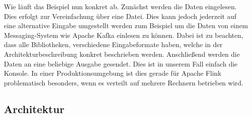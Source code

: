Wie läuft das Beispiel nun konkret ab. Zunächst werden die Daten eingelesen. Dies
erfolgt zur Vereinfachung über eine Datei. Dies kann jedoch jederzeit auf eine
alternative Eingabe umgestellt werden zum Beispiel um die Daten von einem
Messaging-System wie Apache Kafka einlesen zu können. Dabei ist zu beachten,
dass alle Bibliotheken, verschiedene Eingabeformate haben, welche in der
Architekturbeschreibung konkret beschrieben werden. Anschließend werden die
Daten an eine beliebige Ausgabe gesendet. Dies ist in unserem Fall einfach die
Konsole. In einer Produktionsumgebung ist dies gerade für Apache Flink
problematisch besonders, wenn es verteilt auf mehrere Rechnern betrieben wird.

\subsection{Architektur}
